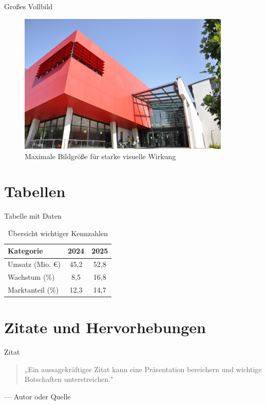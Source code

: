 \documentclass[aspectratio=169,10pt]{beamer}
\begin{document}
\begin{frame}{Großes Vollbild}
\begin{figure}
  \centering
  \includegraphics[width=0.9\textwidth,height=0.75\textheight,keepaspectratio]{assets/dm_roter_wuerfel_ben_steinig.jpg}
  \caption{Maximale Bildgröße für starke visuelle Wirkung}
\end{figure}
\end{frame}

\section{Tabellen}
\begin{frame}{Tabelle mit Daten}
\begin{table}
  \centering
  \caption{Übersicht wichtiger Kennzahlen}
  \begin{tabular}{lcc}
    \toprule
    \textbf{Kategorie} & \textbf{2024} & \textbf{2025} \\
    \midrule
    Umsatz (Mio. €) & 45,2 & 52,8 \\
    Wachstum (\%) & 8,5 & 16,8 \\
    Marktanteil (\%) & 12,3 & 14,7 \\
    \bottomrule
  \end{tabular}
\end{table}
\end{frame}

\section{Zitate und Hervorhebungen}
\begin{frame}{Zitat}
\begin{quote}
  \large
  „Ein aussagekräftiges Zitat kann eine Präsentation bereichern und wichtige Botschaften unterstreichen."
\end{quote}
\vspace{0.5cm}
\begin{flushright}
  --- Autor oder Quelle
\end{flushright}
\end{frame}
\end{document}
